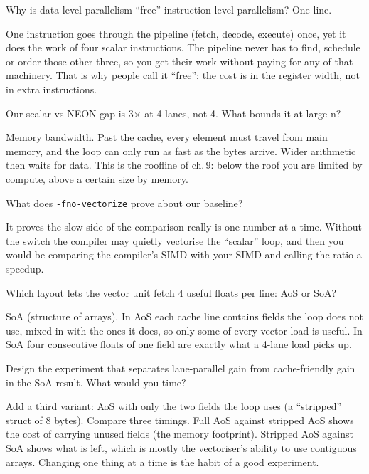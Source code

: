 \begin{exercise}[easy]
Why is data-level parallelism ``free'' instruction-level
parallelism? One line.
\end{exercise}
\begin{solution}
One instruction goes through the pipeline (fetch, decode, execute) once,
yet it does the work of four scalar instructions. The pipeline never has
to find, schedule or order those other three, so you get their work
without paying for any of that machinery. That is why people call it
``free'': the cost is in the register width, not in extra instructions.
\end{solution}
\begin{exercise}[easy]
Our scalar-vs-NEON gap is 3$\times$ at 4 lanes, not 4. What bounds
it at large n?
\end{exercise}
\begin{solution}
Memory bandwidth. Past the cache, every element must travel from main
memory, and the loop can only run as fast as the bytes arrive. Wider
arithmetic then waits for data. This is the roofline of ch.\,9: below
the roof you are limited by compute, above a certain size by memory.
\end{solution}
\begin{exercise}[easy]
What does \texttt{-fno-vectorize} prove about our baseline?
\end{exercise}
\begin{solution}
It proves the slow side of the comparison really is one number at a
time. Without the switch the compiler may quietly vectorise the ``scalar''
loop, and then you would be comparing the compiler's SIMD with your SIMD
and calling the ratio a speedup.
\end{solution}
\begin{exercise}[easy]
Which layout lets the vector unit fetch 4 useful floats per line:
AoS or SoA?
\end{exercise}
\begin{solution}
SoA (structure of arrays). In AoS each cache line contains fields the
loop does not use, mixed in with the ones it does, so only some of every
vector load is useful. In SoA four consecutive floats of one field are
exactly what a 4-lane load picks up.
\end{solution}
\begin{exercise}[medium]
Design the experiment that separates lane-parallel gain from
cache-friendly gain in the SoA result. What would you time?
\end{exercise}
\begin{solution}
Add a third variant: AoS with only the two fields the loop uses (a
``stripped'' struct of 8 bytes). Compare three timings. Full AoS against
stripped AoS shows the cost of carrying unused fields (the memory
footprint). Stripped AoS against SoA shows what is left, which is mostly
the vectoriser's ability to use contiguous arrays. Changing one thing at a
time is the habit of a good experiment.
\end{solution}
